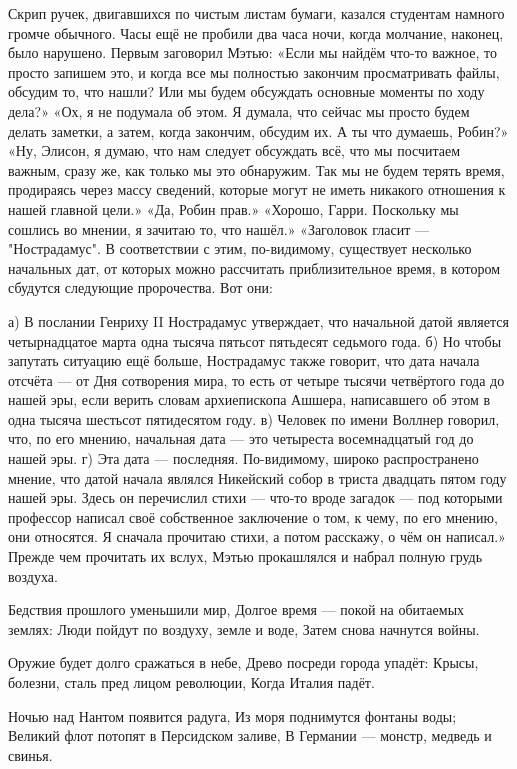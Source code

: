 \documentclass[a4paper,12pt]{book}
\begin{document}
	Скрип ручек, двигавшихся по чистым листам бумаги, казался студентам намного громче обычного.
	Часы ещё не пробили два часа ночи, когда молчание, наконец, было нарушено. Первым заговорил Мэтью:
	«Если мы найдём что-то важное, то просто запишем это, и когда все мы полностью закончим просматривать файлы, обсудим то, что нашли? Или мы будем обсуждать основные моменты по ходу дела?»
	«Ох, я не подумала об этом. Я думала, что сейчас мы просто будем делать заметки, а затем, когда закончим, обсудим их. А ты что думаешь, Робин?»
	«Ну, Элисон, я думаю, что нам следует обсуждать всё, что мы посчитаем важным, сразу же, как только мы это обнаружим. Так мы не будем терять время, продираясь через массу сведений, которые могут не иметь никакого отношения к нашей главной цели.»
	«Да, Робин прав.»
	«Хорошо, Гарри. Поскольку мы сошлись во мнении, я зачитаю то, что нашёл.»
	«Заголовок гласит — "Нострадамус". В соответствии с этим, по-видимому, существует несколько начальных дат, от которых можно рассчитать приблизительное время, в котором сбудутся следующие пророчества. Вот они:

	а) В послании Генриху II Нострадамус утверждает, что начальной датой является четырнадцатое марта одна тысяча пятьсот пятьдесят седьмого года.
	б) Но чтобы запутать ситуацию ещё больше, Нострадамус также говорит, что дата начала отсчёта — от Дня сотворения мира, то есть от четыре тысячи четвёртого года до нашей эры, если верить словам архиепископа Ашшера, написавшего об этом в одна тысяча шестьсот пятидесятом году.
	в)  Человек по имени Воллнер говорил, что, по его мнению, начальная дата — это четыреста восемнадцатый год до нашей эры.
	г) Эта дата — последняя. По-видимому, широко распространено мнение, что датой начала являлся Никейский собор в триста двадцать пятом году нашей эры.
	Здесь он перечислил стихи — что-то вроде загадок — под которыми профессор написал своё собственное заключение о том, к чему, по его мнению, они относятся. Я сначала прочитаю стихи, а потом расскажу, о чём он написал.»
	Прежде чем прочитать их вслух, Мэтью прокашлялся и набрал полную грудь воздуха.

	Бедствия прошлого уменьшили мир,
	Долгое время — покой на обитаемых землях:
	Люди пойдут по воздуху, земле и воде,
	Затем снова начнутся войны.

	Оружие будет долго сражаться в небе,
	Древо посреди города упадёт:
	Крысы, болезни, сталь пред лицом революции,
	Когда Италия падёт.

	Ночью над Нантом появится радуга,
	Из моря поднимутся фонтаны воды;
	Великий флот потопят в Персидском заливе,
	В Германии — монстр, медведь и свинья.	
\end{document}
